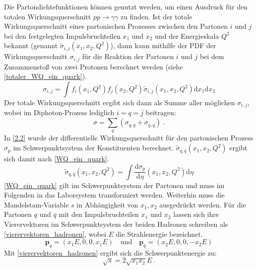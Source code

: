 Die Partondichtefunktionen können genutzt werden, um einen Ausdruck für den totalen Wirkungsquerschnitt $pp \rightarrow \gamma \gamma $ zu finden. Ist der totale Wirkungsquerschnitt eines partonischen Prozesses zwischen den Partonen $i$ und $j$ bei den festgelegten Impulsbruchteilen $x_1$ und $x_2$ und der Energieskala $Q^2$ bekannt (genannt $\tilde{\sigma}_{i,j}(x_1, x_2, Q^2)$), dann kann mithilfe der PDF der Wirkungsquerschnitt $\sigma_{i,j}$ für die Reaktion der Partonen $i$ und $j$ bei dem Zusammenstoß von zwei Protonen berechnet werden (siehe \textsf{\autoref{totaler_WQ_ein_quark}}).
\begin{equation}
\sigma_{i,j} = \int f_i(x_1, Q^2)f_j(x_2, Q^2) \tilde{\sigma}_{i,j}(x_1, x_2, Q^2)\text{d}x_1\text{d}x_2
\label{totaler_WQ_ein_quark}
\end{equation}
Der totale Wirkungsquerschnitt ergibt sich dann als Summe aller möglichen $\sigma_{i,j}$, wobei im Diphoton-Prozess lediglich $i=q=\overline{j}$ beitragen:  
\begin{equation}
\sigma = \sum_{q} \left(\sigma_{q,\overline{q}} + \sigma_{\overline{q},q} \right)~. 
\label{totaler_WQ_als_summe}
\end{equation}
In \textsf{\autoref{2.2}} wurde der differentielle Wirkungsquerschnitt für den partonischen Prozess $\sigma_p$ im Schwerpunktsystem der Konstituenten berechnet. $\tilde{\sigma}_{q,\overline{q}}(x_1, x_2, Q^2)$ ergibt sich damit nach \textsf{\autoref{WQ_ein_quark}}.
\begin{equation}
\tilde{\sigma}_{q,\overline{q}}(x_1, x_2, Q^2) = \int \frac{\text{d}\sigma_{p}}{\text{d}\eta}\left(x_1,x_2, Q^2\right)\text{d} \eta
\label{WQ_ein_quark}
\end{equation}
\textsf{\autoref{WQ_ein_quark}} gilt im Schwerpunktsystem der Partonen und muss im Folgenden in das Laborsystem transformiert werden. Weiterhin muss die Mandelstam-Variable $s$ in Abhängigkeit von $x_1, x_2$ ausgedrückt werden. Für die Partonen $q$ und $\overline{q}$ mit den Impulsbruchteilen $x_1$ und $x_2$ lassen sich ihre Vierervektoren im Schwerpunktsystem der beiden Hadronen schreiben als \textsf{\autoref{vierervektoren_hadronen}}, wobei $E$ die Strahlenergie bezeichnet.
\begin{equation}
\textbf{p}_q = \left(x_1E, 0, 0, x_1E\right) \quad \text{und} \quad \textbf{p}_{\overline{q}} = \left(x_2E, 0, 0, -x_2E\right)
\label{vierervektoren_hadronen}
\end{equation}
Mit \textsf{\autoref{vierervektoren_hadronen}} ergibt sich die Schwerpunktenergie zu:
\begin{equation}
\sqrt{s} = 2\sqrt{x_1x_2}E~.
\end{equation}
